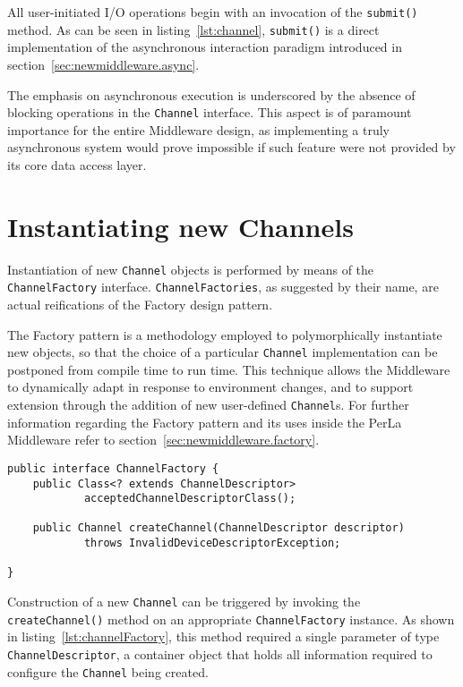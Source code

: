 All user-initiated I/O operations begin with an invocation of the \texttt{submit()} method. As can be seen in listing~\ref{lst:channel}, \texttt{submit()} is a direct implementation of the asynchronous interaction paradigm introduced in section~\ref{sec:newmiddleware.async}.

The emphasis on asynchronous execution is underscored by the absence of blocking operations in the \texttt{Channel} interface. This aspect is of paramount importance for the entire Middleware design, as implementing a truly asynchronous system would prove impossible if such feature were not provided by its core data access layer.


\section{Instantiating new Channels}

Instantiation of new \texttt{Channel} objects is performed by means of the  \texttt{ChannelFactory} interface. \texttt{ChannelFactories}, as suggested by their name, are actual reifications of the Factory design pattern.

The Factory pattern is a methodology employed to polymorphically instantiate new objects, so that the choice of a particular \texttt{Channel} implementation can be postponed from compile time to run time. This technique allows the Middleware to dynamically adapt in response to environment changes, and to support extension through the addition of new user-defined \texttt{Channel}s. For further information regarding the Factory pattern and its uses inside the PerLa Middleware refer to section~\ref{sec:newmiddleware.factory}.

\lstset{language=Java}
\begin{lstlisting}[float,floatplacement=H,caption=The ChannelFactory interface,label={lst:channelFactory}]
public interface ChannelFactory {
	public Class<? extends ChannelDescriptor>
			acceptedChannelDescriptorClass();

	public Channel createChannel(ChannelDescriptor descriptor)
			throws InvalidDeviceDescriptorException;

}
\end{lstlisting}

Construction of a new \texttt{Channel} can be triggered by invoking the \texttt{createChannel()} method on an appropriate \texttt{ChannelFactory} instance. As shown in listing~\ref{lst:channelFactory}, this method required a single parameter of type \texttt{ChannelDescriptor}, a container object that holds all information required to configure the \texttt{Channel} being created.

